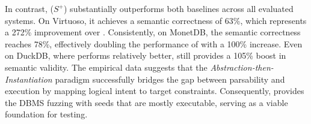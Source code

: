 \documentclass[sigconf,review,anonymous]{acmart}
\begin{document}
\begin{table}[ht]
\centering %
\caption{Comparison of Syntactic and Semantic Correctness. $S^-$, $S$, and $S^+$ denote Raw Seeds, translation seeds by \sedar{}, and translation seeds by \tool{}, respectively.}
\label{tab:validity} %
\renewcommand\arraystretch{1}
\end{table}

In contrast, \tool{} ($S^+$) substantially outperforms both baselines across all evaluated systems. On Virtuoso, it achieves a semantic correctness of 63\%, which represents a 272\% improvement over \sedar{}. Consistently, on MonetDB, the semantic correctness reaches 78\%, effectively doubling the performance of \sedar{} with a 100\% increase. Even on DuckDB, where \sedar{} performs relatively better, \tool{} still provides a 105\% boost in semantic validity. 
The empirical data suggests that the \textit{Abstraction-then-Instantiation} paradigm successfully bridges the gap between parsability and execution by mapping logical intent to target constraints. Consequently, \tool{} provides the DBMS fuzzing with seeds that are mostly executable, serving as a viable foundation for testing.
\end{document}
